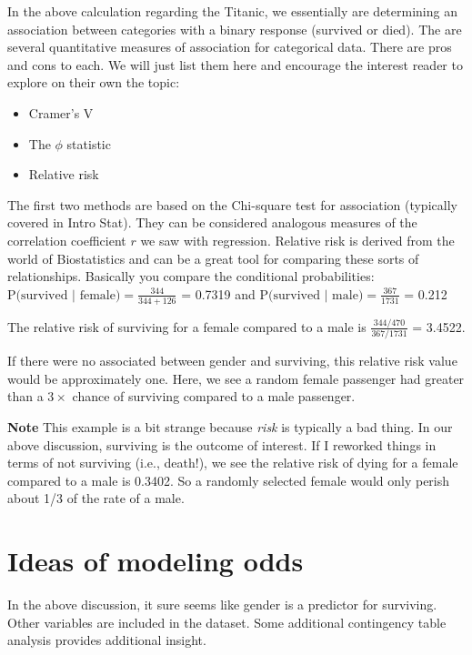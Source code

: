 \documentclass[
]{book}
\providecommand{\tightlist}{%
  \setlength{\itemsep}{0pt}\setlength{\parskip}{0pt}}
\begin{document}
In the above calculation regarding the Titanic, we essentially are determining an association between categories with a binary response (survived or died). The are several quantitative measures of association for categorical data. There are pros and cons to each. We will just list them here and encourage the interest reader to explore on their own the topic:

\begin{itemize}
\tightlist
\item
  Cramer's V
\item
  The \(\phi\) statistic
\item
  Relative risk
\end{itemize}

The first two methods are based on the Chi-square test for association (typically covered in Intro Stat). They can be considered analogous measures of the correlation coefficient \(r\) we saw with regression.
Relative risk is derived from the world of Biostatistics and can be a great tool for comparing these sorts of relationships. Basically you compare the conditional probabilities: \(\textrm{P(survived | female)} = \frac{344}{344+126}\) = 0.7319
and \(\textrm{P(survived | male)} = \frac{367}{1731}\) = 0.212

The relative risk of surviving for a female compared to a male is \(\frac{344/470}{367/1731}\) = 3.4522.

If there were no associated between gender and surviving, this relative risk value would be approximately one.
Here, we see a random female passenger had greater than a \(3\times\) chance of surviving compared to a male passenger.

\textbf{Note} This example is a bit strange because \emph{risk} is typically a bad thing. In our above discussion, surviving is the outcome of interest. If I reworked things in terms of not surviving (i.e., death!), we see the relative risk of dying for a female compared to a male is 0.3402. So a randomly selected female would only perish about 1/3 of the rate of a male.

\hypertarget{ideas-of-modeling-odds}{%
\section{Ideas of modeling odds}\label{ideas-of-modeling-odds}}

In the above discussion, it sure seems like gender is a predictor for surviving. Other variables are included in the dataset. Some additional contingency table analysis provides additional insight.
\end{document}
